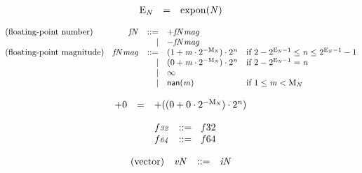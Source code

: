 $$
\begin{array}{@{}lcl@{}l@{}}
{{\mathrm{E}}}_{{\mathit{N}}} &=& {\mathrm{expon}}({\mathit{N}}) &  \\
\end{array}
$$

$$
\begin{array}{@{}lrrl@{}l@{}}
\mbox{(floating-point number)} & {{\mathit{f}}}{{\mathit{N}}} &::=& {+{{{\mathit{f}}}{{\mathit{N}}}}{{\mathit{mag}}}} \\ &&|&
{-{{{\mathit{f}}}{{\mathit{N}}}}{{\mathit{mag}}}} \\
\mbox{(floating-point magnitude)} & {{{\mathit{f}}}{{\mathit{N}}}}{{\mathit{mag}}} &::=& (1 + {\mathit{m}} \cdot {2^{{-{{\mathrm{M}}}_{{\mathit{N}}}}}}) \cdot {2^{{\mathit{n}}}} &\quad
  \mbox{if}~2 - {2^{{{\mathrm{E}}}_{{\mathit{N}}} - 1}} \leq {\mathit{n}} \leq {2^{{{\mathrm{E}}}_{{\mathit{N}}} - 1}} - 1 \\ &&|&
(0 + {\mathit{m}} \cdot {2^{{-{{\mathrm{M}}}_{{\mathit{N}}}}}}) \cdot {2^{{\mathit{n}}}} &\quad
  \mbox{if}~2 - {2^{{{\mathrm{E}}}_{{\mathit{N}}} - 1}} = {\mathit{n}} \\ &&|&
\infty \\ &&|&
{\mathsf{nan}}{({\mathit{m}})} &\quad
  \mbox{if}~1 \leq {\mathit{m}} < {{\mathrm{M}}}_{{\mathit{N}}} \\
\end{array}
$$

$$
\begin{array}{@{}lcl@{}l@{}}
{+0} &=& {+((0 + 0 \cdot {2^{{-{{\mathrm{M}}}_{{\mathit{N}}}}}}) \cdot {2^{{\mathit{n}}}})} &  \\
\end{array}
$$

$$
\begin{array}{@{}lrrl@{}l@{}}
& {\mathit{f{\scriptstyle32}}} &::=& {{\mathit{f}}}{32} \\
& {\mathit{f{\scriptstyle64}}} &::=& {{\mathit{f}}}{64} \\
\end{array}
$$

\vspace{1ex}

$$
\begin{array}{@{}lrrl@{}l@{}}
\mbox{(vector)} & {{\mathit{v}}}{{\mathit{N}}} &::=& {{\mathit{i}}}{{\mathit{N}}} \\
\end{array}
$$

\vspace{1ex}

